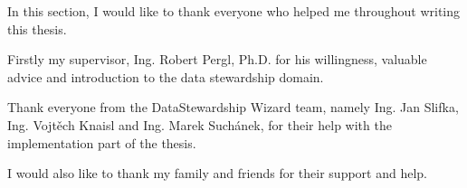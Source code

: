 In this section, I would like to thank everyone who helped me throughout writing this thesis.

Firstly my supervisor, Ing. Robert Pergl, Ph.D. for his willingness, valuable advice and introduction to the data stewardship domain.

Thank everyone from the DataStewardship Wizard team, namely Ing. Jan Slifka, Ing. Vojtěch Knaisl and Ing. Marek Suchánek, for their help with the implementation part of the thesis.

I would also like to thank my family and friends for their support and help.
